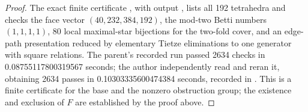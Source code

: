 \begin{proof}
The exact finite certificate
, with output
, lists all 192
tetrahedra and checks the face vector
$(40,232,384,192)$, the mod-two Betti numbers $(1,1,1,1)$,
80 local maximal-star bijections for the two-fold cover, and an
edge-path presentation reduced by elementary Tietze eliminations to
one generator with square relations. The parent's recorded run
passed 2634 checks in 0.08755117800319567 seconds; the author independently
read and reran it, obtaining 2634 passes in 0.10303335600474384 seconds,
recorded in
.
This is a finite
certificate for the base and the nonzero obstruction group; the
existence and exclusion of $F$ are established by the proof above.
\end{proof}
